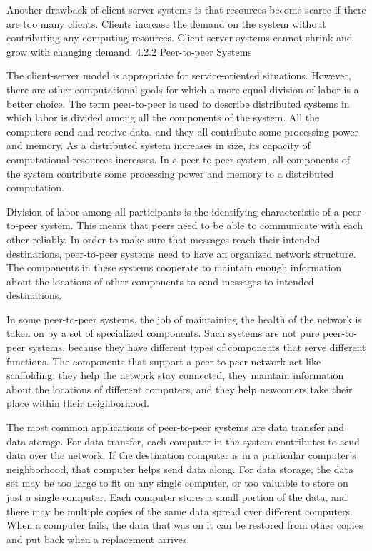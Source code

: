 \documentclass[letterpaper,10pt,dvipdfmx]{sphinxmanual}
\begin{document}
Another drawback of client-server systems is that resources become scarce if there are too many clients. Clients increase the demand on the system without contributing any computing resources. Client-server systems cannot shrink and grow with changing demand.
4.2.2   Peer-to-peer Systems

The client-server model is appropriate for service-oriented situations. However, there are other computational goals for which a more equal division of labor is a better choice. The term peer-to-peer is used to describe distributed systems in which labor is divided among all the components of the system. All the computers send and receive data, and they all contribute some processing power and memory. As a distributed system increases in size, its capacity of computational resources increases. In a peer-to-peer system, all components of the system contribute some processing power and memory to a distributed computation.

Division of labor among all participants is the identifying characteristic of a peer-to-peer system. This means that peers need to be able to communicate with each other reliably. In order to make sure that messages reach their intended destinations, peer-to-peer systems need to have an organized network structure. The components in these systems cooperate to maintain enough information about the locations of other components to send messages to intended destinations.

In some peer-to-peer systems, the job of maintaining the health of the network is taken on by a set of specialized components. Such systems are not pure peer-to-peer systems, because they have different types of components that serve different functions. The components that support a peer-to-peer network act like scaffolding: they help the network stay connected, they maintain information about the locations of different computers, and they help newcomers take their place within their neighborhood.

The most common applications of peer-to-peer systems are data transfer and data storage. For data transfer, each computer in the system contributes to send data over the network. If the destination computer is in a particular computer's neighborhood, that computer helps send data along. For data storage, the data set may be too large to fit on any single computer, or too valuable to store on just a single computer. Each computer stores a small portion of the data, and there may be multiple copies of the same data spread over different computers. When a computer fails, the data that was on it can be restored from other copies and put back when a replacement arrives.
\end{document}
